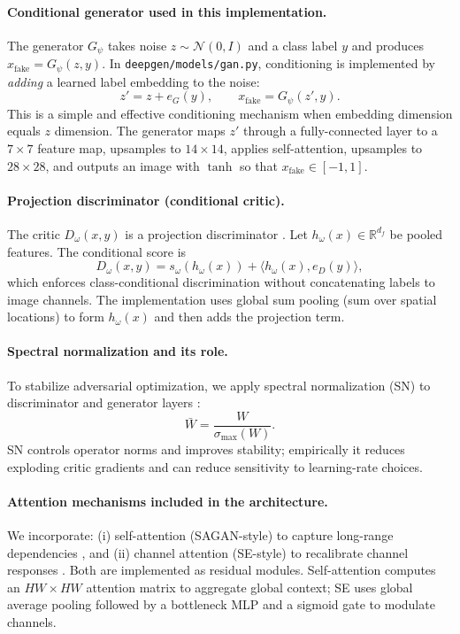 \paragraph{Conditional generator used in this implementation.}
The generator $G_\psi$ takes noise $z\sim\mathcal{N}(0,I)$ and a class label $y$ and produces $x_{\mathrm{fake}}=G_\psi(z,y)$. In \texttt{deepgen/models/gan.py}, conditioning is implemented by \emph{adding} a learned label embedding to the noise:
\[
z' = z + e_G(y),
\qquad x_{\mathrm{fake}} = G_\psi(z',y).
\]
This is a simple and effective conditioning mechanism when embedding dimension equals $z$ dimension. The generator maps $z'$ through a fully-connected layer to a $7\times 7$ feature map, upsamples to $14\times 14$, applies self-attention, upsamples to $28\times 28$, and outputs an image with $\tanh$ so that $x_{\mathrm{fake}}\in[-1,1]$.

\paragraph{Projection discriminator (conditional critic).}
The critic $D_\omega(x,y)$ is a projection discriminator \citep{miyato2018projection}. Let $h_\omega(x)\in\mathbb{R}^{d_f}$ be pooled features. The conditional score is
\[
D_\omega(x,y)=s_\omega(h_\omega(x)) + \langle h_\omega(x), e_D(y)\rangle,
\]
which enforces class-conditional discrimination without concatenating labels to image channels. The implementation uses global sum pooling (sum over spatial locations) to form $h_\omega(x)$ and then adds the projection term.

\paragraph{Spectral normalization and its role.}
To stabilize adversarial optimization, we apply spectral normalization (SN) to discriminator and generator layers \citep{miyato2018sn}:
\[
\bar{W}=\frac{W}{\sigma_{\max}(W)}.
\]
SN controls operator norms and improves stability; empirically it reduces exploding critic gradients and can reduce sensitivity to learning-rate choices.

\paragraph{Attention mechanisms included in the architecture.}
We incorporate:
(i) self-attention (SAGAN-style) to capture long-range dependencies \citep{zhang2019sagan}, and
(ii) channel attention (SE-style) to recalibrate channel responses \citep{hu2018senet}.
Both are implemented as residual modules. Self-attention computes an $HW\times HW$ attention matrix to aggregate global context; SE uses global average pooling followed by a bottleneck MLP and a sigmoid gate to modulate channels.

